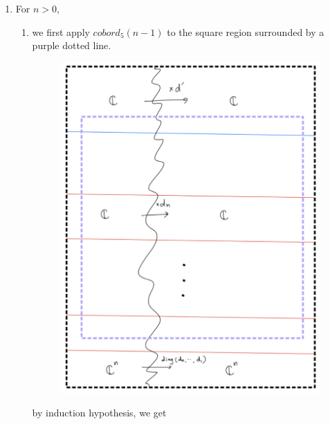 \begin{enumerate}[label = (\roman*)]
\item For $n>0$,
\begin{enumerate}[label = (Step \arabic*)]
\item we first apply $cobord_5(n-1)$ to the square region surrounded by a purple dotted line.

\begin{figure}[H]
    \centering
    \includegraphics[scale = 0.95]{diagrams/cobord5/4.png} 
    \caption{}
    \label{fig:your-label}
\end{figure}

by induction hypothesis, we get


\end{enumerate}
\end{enumerate}
